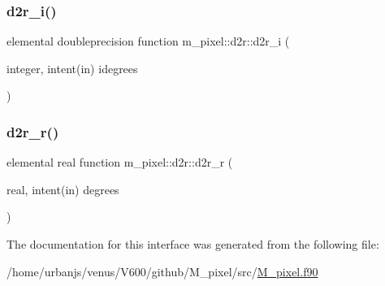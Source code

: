 \subsubsection{\texorpdfstring{d2r\+\_\+i()}{d2r\_i()}}
{\footnotesize\ttfamily elemental doubleprecision function m\+\_\+pixel\+::d2r\+::d2r\+\_\+i (\begin{DoxyParamCaption}\item[{integer, intent(in)}]{idegrees }\end{DoxyParamCaption})\hspace{0.3cm}{\ttfamily [private]}}

\mbox{\label{interfacem__pixel_1_1d2r_a24689b2e99235ea61bce52bb58e00d03}} 
\subsubsection{\texorpdfstring{d2r\+\_\+r()}{d2r\_r()}}
{\footnotesize\ttfamily elemental real function m\+\_\+pixel\+::d2r\+::d2r\+\_\+r (\begin{DoxyParamCaption}\item[{real, intent(in)}]{degrees }\end{DoxyParamCaption})\hspace{0.3cm}{\ttfamily [private]}}



The documentation for this interface was generated from the following file\+:\begin{DoxyCompactItemize}
\item 
/home/urbanjs/venus/\+V600/github/\+M\+\_\+pixel/src/\mbox{\hyperlink{M__pixel_8f90}{M\+\_\+pixel.\+f90}}\end{DoxyCompactItemize}
